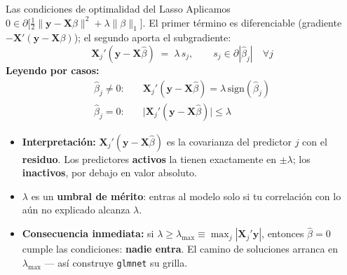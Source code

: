 \documentclass{beamer}
\newcommand{\1}{\mathbb{I}}
\newcommand{\sign}{\mathrm{sign}}
\begin{document}
\begin{frame}{Las condiciones de optimalidad del Lasso}
\small
Aplicamos $0 \in \partial\big[ \tfrac{1}{2}\|\mathbf{y} - \mathbf{X}\beta\|^2 + \lambda \|\beta\|_1 \big]$. El primer término es diferenciable (gradiente $-\mathbf{X}'(\mathbf{y} - \mathbf{X}\beta)$); el segundo aporta el subgradiente:
\pause
\[ \mathbf{X}_j'(\mathbf{y} - \mathbf{X}\hat{\beta}) \;=\; \lambda\, s_j, \qquad s_j \in \partial|\hat{\beta}_j| \quad \forall j \]
\pause
\textbf{Leyendo por casos:}
\[ \boxed{ \;\begin{aligned}
\hat{\beta}_j \neq 0:& \quad \mathbf{X}_j'(\mathbf{y} - \mathbf{X}\hat{\beta}) = \lambda\, \sign(\hat{\beta}_j) \\
\hat{\beta}_j = 0:& \quad \big| \mathbf{X}_j'(\mathbf{y} - \mathbf{X}\hat{\beta}) \big| \leq \lambda
\end{aligned}\; } \]
\pause

\begin{itemize}\itemsep4pt
  \item \textbf{Interpretación:} $\mathbf{X}_j'(\mathbf{y} - \mathbf{X}\hat{\beta})$ es la covarianza del predictor $j$ con el \textbf{residuo}. Los predictores \textbf{activos} la tienen exactamente en $\pm\lambda$; los \textbf{inactivos}, por debajo en valor absoluto.
  \item $\lambda$ es un \textbf{umbral de mérito}: entras al modelo solo si tu correlación con lo aún no explicado alcanza $\lambda$. \pause
  \item \textbf{Consecuencia inmediata:} si $\lambda \geq \lambda_{\max} \equiv \max_j |\mathbf{X}_j'\mathbf{y}|$, entonces $\hat{\beta} = 0$ cumple las condiciones: \textbf{nadie entra}. El camino de soluciones arranca en $\lambda_{\max}$ --- así construye \texttt{glmnet} su grilla.
\end{itemize}
\end{frame}
\end{document}
